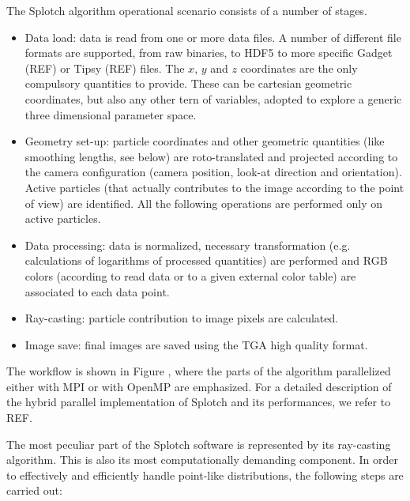 \documentclass[11pt]{article}
\begin{document}
The Splotch algorithm operational scenario consists of a number of stages. 
\begin{itemize}
\item
Data load: data is read from one or more data files. A number of different file
formats are supported, from raw binaries, to HDF5 to more specific Gadget (REF) or Tipsy (REF)
files. The $x$, $y$ and $z$ coordinates are the only compulsory quantities to provide.
These can be cartesian geometric coordinates, but also any other tern 
of variables, adopted to explore a generic three dimensional parameter space.
\item
Geometry set-up: particle coordinates and other geometric quantities 
(like smoothing lengths, see below) are roto-translated and projected according to the 
camera configuration (camera position, look-at direction and orientation). 
Active particles (that actually contributes to the image according to the point of view)
are identified. All the following operations are performed only on active particles.
\item
Data processing: data is normalized, necessary 
transformation (e.g. calculations of logarithms of processed quantities) are performed
and RGB colors (according to read data or to a given
external color table) are associated to each data point. 
\item
Ray-casting: particle contribution to image pixels are calculated.
\item
Image save: final images are saved using the TGA high quality format.
\end{itemize}
The workflow is shown in Figure , where the parts of the algorithm parallelized
either with MPI or with OpenMP are emphasized. For a detailed description of
the hybrid parallel implementation of Splotch and its performances, we refer to REF.


The most peculiar part of the Splotch software is represented by its ray-casting algorithm.
This is also its most computationally demanding component.
In order to effectively and efficiently handle point-like distributions, the following 
steps are carried out: 
\end{document}
